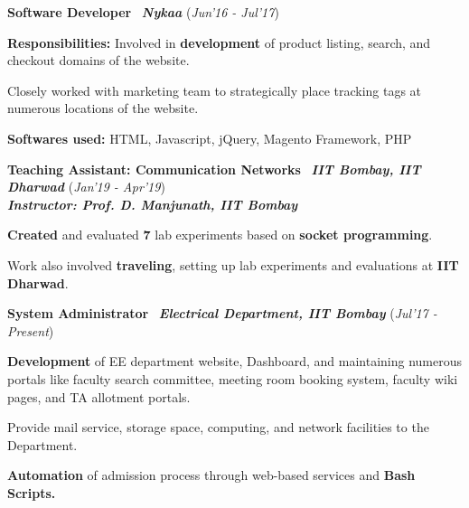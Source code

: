 \documentclass[10pt]{article}
\newcommand{\highlight}[1]{\framecolorbox[\textwidth]{black}{bl}{\makebox[\textwidth][l]{\bfseries \color{black} #1}}}
\newcommand{\mystyle}[1]{\textbf{\textit{\textcolor{llb}{#1}}}}
\newcommand{\guide}[1]{\textbf{\textit{\textcolor{llb}{#1}}}}
\begin{document}
	\highlight{WORK EXPERIENCE}
	\begin{myitemize}
		\item \textbf{Software Developer} \textpipe\ \mystyle{Nykaa} \hfill{(\textit{Jun'16 - Jul'17})}
		\begin{myitemize}
			\item \textbf{Responsibilities:} Involved in \textbf{development} of product listing, search, and checkout domains of the website.
			\item Closely worked with marketing team to strategically place tracking tags at numerous locations of the website.
			\item \textbf{Softwares used:} HTML, Javascript, jQuery, Magento Framework, PHP
		\end{myitemize}

		\item \textbf{Teaching Assistant: Communication Networks} \textpipe\ \mystyle{IIT Bombay, IIT Dharwad} \hfill{(\textit{Jan'19 - Apr'19})}\\
		\guide{Instructor: Prof. D. Manjunath, IIT Bombay}
		\begin{myitemize}
			\item \textbf{Created} and evaluated \textbf{7} lab experiments based on \textbf{socket programming}.
			\item Work also involved \textbf{traveling}, setting up lab experiments and evaluations at \textbf{IIT Dharwad}.
		\end{myitemize}

		\item \textbf{System Administrator} \textpipe\ \mystyle{Electrical Department, IIT Bombay} \hfill{(\textit{Jul'17 - Present})}
		\begin{myitemize}
			\item \textbf{Development} of EE department website, Dashboard, and maintaining numerous portals like faculty search committee, meeting room booking system, faculty wiki pages, and TA allotment portals.
			\item Provide mail service, storage space, computing, and network facilities to the Department.
			\item \textbf{Automation} of admission process through web-based services and \textbf{Bash Scripts.}
		\end{myitemize}
	\end{myitemize}
\end{document}
